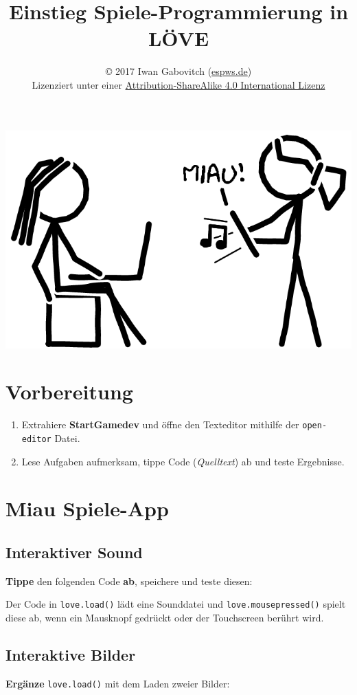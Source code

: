 \documentclass[a4paper, 11pt]{article}
\date{\vspace{-5ex}}
\title{\vspace{-8ex}Einstieg Spiele-Programmierung in LÖVE\vspace{-1ex}}
\author{\copyright{} 2017 Iwan Gabovitch (\href{http://espws.de}{espws.de})\\
Lizenziert unter einer \href{http://creativecommons.org/licenses/by-sa/4.0/}{Attribution-ShareAlike 4.0 International Lizenz}}
\begin{document}
\maketitle
\thispagestyle{fancy}

\begin{center}
  \includegraphics[width=.4\textwidth]{graphics/fertig.png}
\end{center}

\section{Vorbereitung}

\begin{enumerate}
  \item Extrahiere \textbf{StartGamedev} und öffne den Texteditor mithilfe der \texttt{open-editor} Datei.
  \item Lese Aufgaben aufmerksam, tippe Code (\textit{Quelltext}) ab und teste Ergebnisse.
\end{enumerate}

\section{Miau Spiele-App}

\subsection{Interaktiver Sound}

\textbf{Tippe} den folgenden Code \textbf{ab}, speichere und teste diesen:



Der Code in \texttt{love.load()} lädt eine Sounddatei und \texttt{love.mousepressed()} spielt diese ab, wenn ein Mausknopf gedrückt oder der Touchscreen berührt wird.

\subsection{Interaktive Bilder}

\textbf{Ergänze} \texttt{love.load()} mit dem Laden zweier Bilder:
\end{document}
